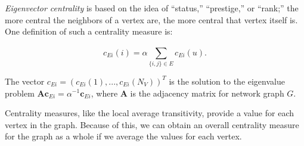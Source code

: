 \documentclass[12pt,twoside]{amherstthesis}
\begin{document}
  \emph{Eigenvector centrality} is based on the idea of ``status,''
  ``prestige,'' or ``rank;'' the more central the neighbors of a vertex
  are, the more central that vertex itself is. One definition of such a
  centrality measure is:
  
  \[c_{Ei}(i) = \alpha \sum_{\{i,j\} \in E}^{} c_{Ei} (u).\]
  
  The vector \(c_{Ei} = (c_{Ei}(1), ..., c_{Ei}(N_V))^T\) is the solution
  to the eigenvalue problem
  \(\textbf{A}\textbf{c}_{Ei} = \alpha^{-1}\textbf{c}_{Ei}\), where
  \(\textbf{A}\) is the adjacency matrix for network graph \(G\).
  
  Centrality measures, like the local average transitivity, provide a
  value for each vertex in the graph. Because of this, we can obtain an
  overall centrality measure for the graph as a whole if we average the
  values for each vertex.
  
\end{document}
